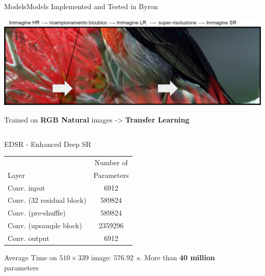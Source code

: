 \documentclass[10pt, unicode]{beamer}
\begin{document}
\begin{frame}{Models}{Models Implemented and Tested in Byron}
  
  \centering
  \includegraphics[width=0.78\linewidth]{images/compare.png}
  
  {Trained on \textbf{RGB Natural} images -> \textbf{Transfer Learning}}
  \begin{columns}
    \begin{column}{0.5\textwidth}
      \begin{alertblock}{EDSR - Enhanced Deep SR}
        \scriptsize{
        \begin{tabular}{lc}
          \hline \rowcolor{orange!20!white}
                                   & Number of    \\
          \rowcolor{orange!20!white}
          Layer                     & Parameters   \\
          \hline
          Conv. input                 & 6912          \\
          Conv. (32 residual block)   & 589824     \\
          Conv. (pre-shuffle)         & 589824        \\
          Conv. (upsample block)   & 2359296       \\
          Conv. output               & 6912        \\
          \hline
        \end{tabular}
        }
        \scriptsize{Average Time on $510\times339$ image: $576.92$~s.}
        \scriptsize{More than \textbf{40 million} parameters}
      \end{alertblock}
    \end{column}
    
    \begin{column}{0.5\textwidth}


\end{column}
\end{columns}
\end{frame}
\end{document}
